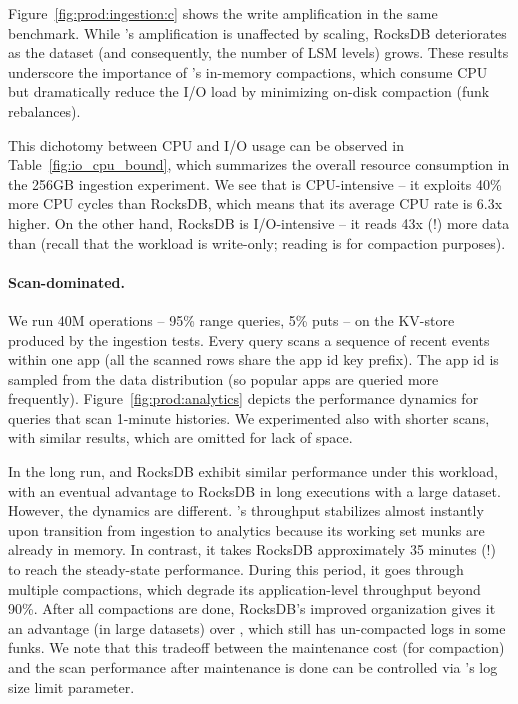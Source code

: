 Figure~\ref{fig:prod:ingestion:c} shows the write amplification in the same benchmark. 
While \sys's amplification is unaffected by  scaling, RocksDB deteriorates as the dataset (and consequently, the number of LSM levels) grows. 
These results underscore the importance of \sys's in-memory compactions, which consume CPU 
but dramatically reduce the I/O load by minimizing on-disk compaction (funk rebalances). 

This dichotomy between CPU and I/O usage can be observed in 
Table~\ref{fig:io_cpu_bound}, which summarizes  the overall resource consumption in the  256GB ingestion
experiment. We see that \sys\/ is CPU-intensive -- it exploits 40\% more CPU cycles than RocksDB, which means that its average CPU rate is 6.3x higher. 
On the other hand, RocksDB is I/O-intensive -- it reads 43x (!) more data than \sys\/ (recall that the workload is write-only; reading is for compaction purposes). 


\paragraph{Scan-dominated.} We run 40M operations -- 95\% range queries, 5\% puts -- 
on the KV-store produced by the ingestion tests.
Every query scans a sequence of recent events within one app (all the scanned rows 
share the  app id key prefix).  
The app id is sampled from the data distribution (so popular apps are queried more frequently).  
Figure~\ref{fig:prod:analytics} depicts the performance dynamics for queries that scan 1-minute histories.
We experimented also with shorter scans, with similar results, which are omitted for lack of space.

In the long run, \sys\/ and RocksDB exhibit similar performance under this workload, with an eventual advantage to RocksDB in long executions with a large dataset. 
However, the  dynamics are different. \sys's throughput stabilizes 
almost instantly upon transition from ingestion to analytics because its working set munks are already in memory. 
In contrast, it takes RocksDB approximately 35 minutes (!) to reach the steady-state performance. 
During this period, it goes through multiple compactions, which degrade its application-level throughput beyond 90\%. 
After all compactions are done, RocksDB's improved organization gives it an advantage (in large datasets) over \sys, 
which still has un-compacted logs in some funks. We note that this tradeoff between the maintenance cost (for compaction) 
and the scan performance after maintenance is done can be controlled via \sys's log size limit parameter. 

